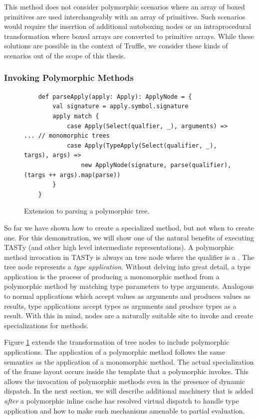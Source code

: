 This method does not consider polymorphic scenarios where an array of boxed primitives are used interchangeably with an array of primitives.
Such scenarios would require the insertion of additional autoboxing nodes or an intraprocedural transformation where boxed arrays are converted to primitive arrays.
While these solutions are possible in the context of Truffle, we consider these kinds of scenarios out of the scope of this thesis.

\subsubsection*{Invoking Polymorphic Methods}

\begin{figure}[!htb]
	\begin{verbatim}
	def parseApply(apply: Apply): ApplyNode = {
		val signature = apply.symbol.signature
		apply match {
			case Apply(Select(qualfier, _), arguments) => ... // monomorphic trees
			case Apply(TypeApply(Select(qualifier, _), targs), args) =>
				new ApplyNode(signature, parse(qualifier), (targs ++ args).map(parse))
		}
	}
	\end{verbatim}
	\caption{Extension to parsing a polymorphic  tree.}
	\label{impl:parse-typeapply}
\end{figure}

So far we have shown how to create a specialized method, but not when to create one.
For this demonstration, we will show one of the natural benefits of executing TASTy (and other high level intermediate representations).
A polymorphic method invocation in TASTy is always an  tree node where the qualifier is a .
The  tree node represents a \textit{type application}.
Without delving into great detail, a type application is the process of producing a monomorphic method from a polymorphic method by matching type parameters to type arguments.
Analogous to normal applications which accept values as arguments and produces values as results, type applications accept types as arguments and produce types as a result.
With this in mind,  nodes are a naturally suitable site to invoke and create specializations for methods.

Figure \ref{impl:parse-typeapply} extends the transformation of  tree nodes to include polymorphic applications.
The application of a polymorphic method follows the same semantics as the application of a monomorphic method.
The actual specialization of the frame layout occurs inside the template that a polymorphic  invokes.
This allows the invocation of polymorphic methods even in the presence of dynamic dispatch.
In the next section, we will describe additional machinery that is added \textit{after} a polymorphic inline cache has resolved virtual dispatch to handle type application and how to make such mechanisms amenable to partial evaluation.

